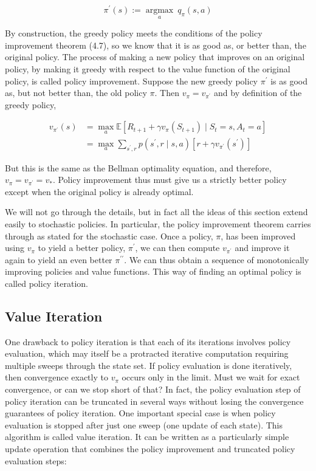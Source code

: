 \documentclass[11pt]{article}
\theoremstyle{plain} %
\theoremstyle{remark}
\begin{document}
$$
  \pi^{\prime}(s):=\underset{a}{\operatorname{argmax}} ~ q_{\pi}(s, a)
$$

By construction, the greedy policy meets the conditions of the policy
improvement theorem (4.7), so we know that it is as good as, or better than,
the original policy. The process of making a new policy that improves on an original
policy, by making it greedy with respect to the value function of the
original policy, is called {\color{C3}policy improvement}. Suppose the new greedy policy $\pi^{\prime}$ is as good as, but not
better than, the old policy $\pi$. Then $v_{\pi}=v_{\pi^{\prime}}$ and by definition of the greedy
policy,

$$
  \begin{aligned}
    v_{\pi^{\prime}}(s) & =\max _{a} \mathbb{E}\left[R_{t+1}+\gamma v_{\pi}\left(S_{t+1}\right) \mid S_{t}=s, A_{t}=a\right]                                 \\
                        & =\max _{a} \sum_{s^{\prime}, r} p\left(s^{\prime}, r \mid s, a\right)\left[r+\gamma v_{\pi^{\prime}}\left(s^{\prime}\right)\right]
  \end{aligned}
$$

But this is the same as the Bellman optimality equation, and
therefore, $v_{\pi}=v_{\pi^{\prime}}=v_{*}$. Policy improvement thus must give us a strictly better policy except
when the original policy is already optimal. 

We will not go through the details, but in fact all the ideas of this
section extend easily to stochastic policies. In particular, the policy improvement theorem carries through as
stated for the stochastic case. Once a policy, $\pi$, has been improved using $v_{\pi}$ to yield a
better policy, $\pi^{\prime}$, we can then compute $v_{\pi^{\prime}}$ and
improve it again to yield an even better $\pi^{\prime \prime}$. We can thus obtain a sequence of monotonically improving policies and
value functions. This way of finding an optimal policy is called {\color{C3}policy iteration}.


\subsection{Value Iteration}
One drawback to policy iteration is that each of its iterations
involves policy evaluation, which may itself be a protracted iterative
computation requiring multiple sweeps through the state set. If policy evaluation is done iteratively, then convergence exactly to
$v_{\pi}$ occurs only in the limit. Must we wait for exact convergence, or can we stop short of that? In fact, the policy evaluation step of policy iteration can be
truncated in several ways without losing the convergence guarantees of
policy iteration. One important special case is when policy evaluation is stopped after
just one sweep (one update of each state). This algorithm is called value iteration. It can be written as a particularly simple update operation that
combines the policy improvement and truncated policy evaluation steps:
\end{document}
